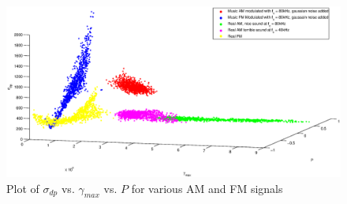 \documentclass[10pt,twocolumn]{witseiepaper}
\begin{document}
\label{app:prelim}
	\begin{figure}[h]
		\centering
		\includegraphics[width=1\textwidth]{plot0.eps}
		\caption{Plot of $\sigma_{dp}$ vs. $\gamma_{max}$ vs. $P$ for various AM and FM signals}
		\label{fig:plot0}
	\end{figure}

\end{document}
